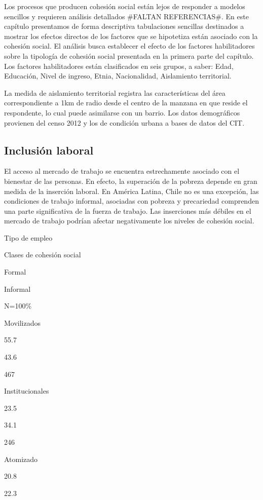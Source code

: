 \documentclass[
  12pt,
]{book}
\begin{document}
Los procesos que producen cohesión social están lejos de responder a modelos sencillos y requieren análisis detallados \#FALTAN REFERENCIAS\#. En este capítulo presentamos de forma descriptiva tabulaciones sencillas destinados a mostrar los efectos directos de los factores que se hipotetiza están asociado con la cohesión social. El análisis busca establecer el efecto de los factores habilitadores sobre la tipología de cohesión social presentada en la primera parte del capítulo. Los factores habilitadores están clasificados en seis grupos, a saber: Edad, Educación, Nivel de ingreso, Etnia, Nacionalidad, Aislamiento territorial.

La medida de aislamiento territorial registra las características del área correspondiente a 1km de radio desde el centro de la manzana en que reside el respondente, lo cual puede asimilarse con un barrio. Los datos demográficos provienen del censo 2012 y los de condición urbana a bases de datos del CIT.

\hypertarget{inclusiuxf3n-laboral}{%
\subsection{Inclusión laboral}\label{inclusiuxf3n-laboral}}

El acceso al mercado de trabajo se encuentra estrechamente asociado con el bienestar de las personas. En efecto, la superación de la pobreza depende en gran medida de la inserción laboral. En América Latina, Chile no es una excepción, las condiciones de trabajo informal, asociadas con pobreza y precariedad comprenden una parte significativa de la fuerza de trabajo. Las inserciones más débiles en el mercado de trabajo podrían afectar negativamente los niveles de cohesión social.

Tipo de empleo

Clases de cohesión social

Formal

Informal

N=100\%

Movilizados

55.7

43.6

467

Institucionales

23.5

34.1

246

Atomizado

20.8

22.3
\end{document}
